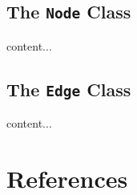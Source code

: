 \documentclass[xcolor={usenames,dvipsnames,svgnames}]{beamer}
\begin{document}
\subsection{The {\tt Node} Class}
\begin{frame}
content...
\end{frame}
\subsection{The {\tt Edge} Class}
\begin{frame}
content...
\end{frame}


\section{References}
\begin{frame}[allowframebreaks]
\nocite{*}
\printbibliography
\end{frame}
\end{document}
